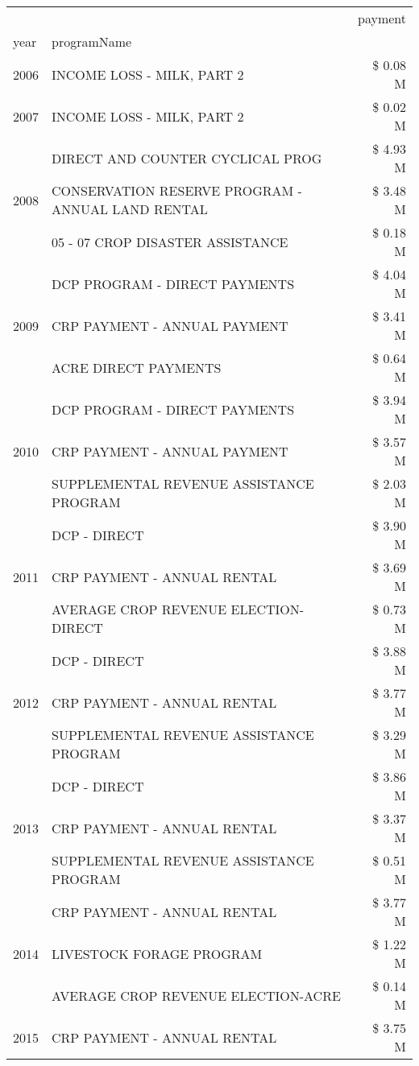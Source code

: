 \begin{tabular}{llr}
\toprule
 &  & payment \\
year & programName &  \\
\midrule
2006 & INCOME LOSS - MILK, PART 2 & \$ 0.08 M \\
\cline{1-3}
2007 & INCOME LOSS - MILK, PART 2 & \$ 0.02 M \\
\cline{1-3}
\multirow[t]{3}{*}{2008} & DIRECT AND COUNTER CYCLICAL PROG & \$ 4.93 M \\
 & CONSERVATION RESERVE PROGRAM - ANNUAL LAND RENTAL & \$ 3.48 M \\
 & 05 - 07 CROP DISASTER ASSISTANCE & \$ 0.18 M \\
\cline{1-3}
\multirow[t]{3}{*}{2009} & DCP PROGRAM - DIRECT PAYMENTS & \$ 4.04 M \\
 & CRP PAYMENT - ANNUAL PAYMENT & \$ 3.41 M \\
 & ACRE DIRECT PAYMENTS & \$ 0.64 M \\
\cline{1-3}
\multirow[t]{3}{*}{2010} & DCP PROGRAM - DIRECT PAYMENTS & \$ 3.94 M \\
 & CRP PAYMENT - ANNUAL PAYMENT & \$ 3.57 M \\
 & SUPPLEMENTAL REVENUE ASSISTANCE PROGRAM & \$ 2.03 M \\
\cline{1-3}
\multirow[t]{3}{*}{2011} & DCP - DIRECT & \$ 3.90 M \\
 & CRP PAYMENT - ANNUAL RENTAL & \$ 3.69 M \\
 & AVERAGE CROP REVENUE ELECTION-DIRECT & \$ 0.73 M \\
\cline{1-3}
\multirow[t]{3}{*}{2012} & DCP - DIRECT & \$ 3.88 M \\
 & CRP PAYMENT - ANNUAL RENTAL & \$ 3.77 M \\
 & SUPPLEMENTAL REVENUE ASSISTANCE PROGRAM & \$ 3.29 M \\
\cline{1-3}
\multirow[t]{3}{*}{2013} & DCP - DIRECT & \$ 3.86 M \\
 & CRP PAYMENT - ANNUAL RENTAL & \$ 3.37 M \\
 & SUPPLEMENTAL REVENUE ASSISTANCE PROGRAM & \$ 0.51 M \\
\cline{1-3}
\multirow[t]{3}{*}{2014} & CRP PAYMENT - ANNUAL RENTAL & \$ 3.77 M \\
 & LIVESTOCK FORAGE PROGRAM & \$ 1.22 M \\
 & AVERAGE CROP REVENUE ELECTION-ACRE & \$ 0.14 M \\
\cline{1-3}
\multirow[t]{3}{*}{2015} & CRP PAYMENT - ANNUAL RENTAL & \$ 3.75 M \\

\end{tabular}
